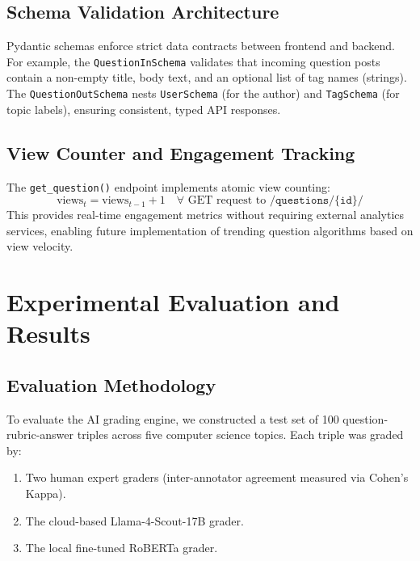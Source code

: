 \documentclass[conference]{IEEEtran}
\begin{document}
\subsection{Schema Validation Architecture}
Pydantic schemas enforce strict data contracts between frontend and backend. For example, the \texttt{QuestionInSchema} validates that incoming question posts contain a non-empty title, body text, and an optional list of tag names (strings). The \texttt{QuestionOutSchema} nests \texttt{UserSchema} (for the author) and \texttt{TagSchema} (for topic labels), ensuring consistent, typed API responses.

\subsection{View Counter and Engagement Tracking}
The \texttt{get\_question()} endpoint implements atomic view counting:
\begin{equation}
\text{views}_{t} = \text{views}_{t-1} + 1 \quad \forall \text{ GET request to } \texttt{/questions/\{id\}/}
\end{equation}
This provides real-time engagement metrics without requiring external analytics services, enabling future implementation of trending question algorithms based on view velocity.

\section{Experimental Evaluation and Results}

\subsection{Evaluation Methodology}
To evaluate the AI grading engine, we constructed a test set of 100 question-rubric-answer triples across five computer science topics. Each triple was graded by:
\begin{enumerate}[leftmargin=*]
    \item Two human expert graders (inter-annotator agreement measured via Cohen's Kappa).
    \item The cloud-based Llama-4-Scout-17B grader.
    \item The local fine-tuned RoBERTa grader.
\end{enumerate}
\end{document}
